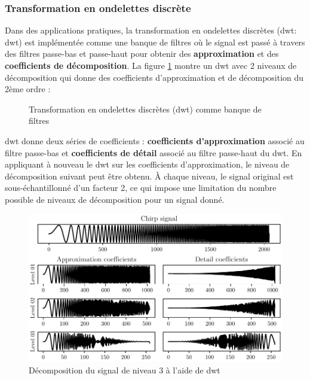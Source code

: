 \subsubsection{Transformation en ondelettes discrète}%
\label{subsub:transformation_en_ondelettes_discrete}

Dans des applications pratiques, la transformation en ondelettes discrètes (\acrlong{dwt}: \acrshort{dwt}) est implémentée comme une banque de filtres où le signal est passé à travers des filtres passe-bas et passe-haut pour obtenir des \textbf{approximation} et des \textbf{coefficients de décomposition}. La figure \ref{fig:dwt} montre un \acrshort{dwt} avec 2 niveaux de décomposition qui donne des coefficients d'approximation et de décomposition du 2ème ordre :

\begin{figure}[H]
    \centering
    
    \caption{Transformation en ondelettes discrètes (\acrshort{dwt}) comme banque de filtres}
    \label{fig:dwt}
\end{figure}

\acrshort{dwt} donne deux séries de coefficients : \textbf{coefficients d'approximation} associé au filtre passe-bas et \textbf{coefficients de détail} associé au filtre passe-haut du \acrshort{dwt}. En appliquant à nouveau le \acrshort{dwt} sur les coefficients d'approximation, le niveau de décomposition suivant peut être obtenu. À chaque niveau, le signal original est sous-échantillonné d'un facteur 2, ce qui impose une limitation du nombre possible de niveaux de décomposition pour un signal donné.

\begin{figure}[h]
    \centering
    \includegraphics{figures/dwt_chirp.pdf}
    \caption{Décomposition du signal de niveau 3 à l'aide de \acrshort{dwt}}
    \label{fig:dwt-chirp-signal}
\end{figure}



